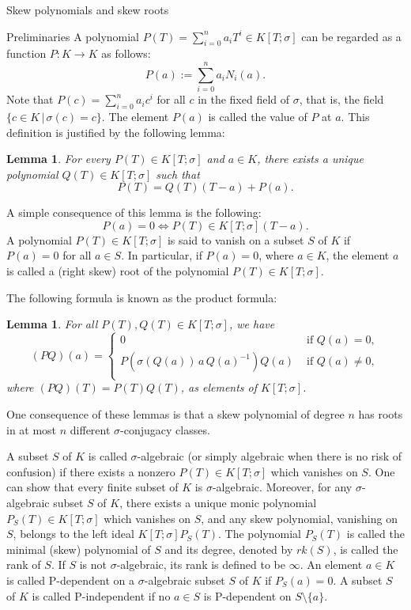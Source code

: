 \documentclass[11pt,a4paper]{article}
\theoremstyle{theorem}
\newtheorem{lemma}[theorem]{Lemma}
\numberwithin{equation}{section}
\newcommand{\s}{\sigma}
\begin{document}
\begin{section}{Skew polynomials and skew roots}
\begin{subsection}{Preliminaries}
	A polynomial $P(T)=\sum_{i=0}^{n}a_iT^i\in K[T;\s]$ can be regarded as a function $P:K\to K$ as follows:
	$$P(a):=\sum_{i=0}^{n}a_iN_i(a).$$
	Note that $P(c)=\sum_{i=0}^{n}a_ic^i$ for all $c$ in the fixed field of $\s$, that is, the field $\{c\in K\,|\, \s(c)=c\}$. The element $P(a)$ is called the value of $P$ at $a$. This definition is justified by the following lemma:
	\begin{lemma}\label{(L)DivisionP(a)}
	For every $P(T)\in K[T;\sigma]$ and $a\in K$, there exists a unique polynomial $Q(T)\in  K[T;\sigma]$  such that 
	$$P(T)=Q(T)(T-a)+P(a).$$			
	\end{lemma}
	A simple consequence of this lemma is the following: 
	$$P(a)=0\iff P(T)\in  K[T;\sigma](T-a).$$
	A polynomial $P(T)\in K[T;\sigma]$ is said to vanish on a subset $S$ of $K$ if $P(a)=0$ for all $a\in S$. In particular, if $P(a)=0$, where $a\in K$, the element $a$ is called a (right skew) root of the polynomial $P(T)\in K[T;\sigma]$. 
	
	The following formula is known as the product formula:	 
	\begin{lemma}\label{(L)ProductPQ(a)}
		For all $P(T), Q(T)\in K[T;\sigma]$, we have
		$$(PQ)(a)=\begin{cases}
			0& \text{ if } Q(a)=0,\\
			P\left( \sigma(Q(a))\, a \, Q(a)^{-1}\right) Q(a)  & \text{ if } Q(a)\neq 0,\\
		\end{cases}
		$$
		where  $(PQ)(T)=P(T)Q(T)$, as elements of $K[T;\sigma]$.  
	\end{lemma}

	One consequence of these lemmas is that a skew polynomial of degree $n$ has roots in at most $n$ different $\s$-conjugacy classes. 
	
	A subset $S$ of $K$ is called $\s$-algebraic (or simply algebraic when there is no risk of confusion) if there exists a nonzero $P(T)\in K[T;\s]$  which vanishes on $S$. One can show that every finite   subset  of $K$ is $\s$-algebraic. Moreover, 
	for any $\s$-algebraic subset $S$ of $K$, there exists a unique monic polynomial $P_S(T)\in K[T;\s]$ which vanishes on $S$, and any skew polynomial, vanishing on $S$, belongs to the left ideal $K[T;\s]P_S(T)$. The polynomial $P_S(T)$ is called the minimal (skew) polynomial of $S$ and its  degree, denoted by $rk(S)$, is called the rank of $S$. If $S$ is not $\s$-algebraic, its rank is defined to be $\infty$.  An element $a\in K$ is called P-dependent on a  $\s$-algebraic subset $S$ of $K$ if $P_S(a)=0$.  A subset $S$ of $K$ is called  P-independent  if no $a\in S$ is P-dependent on $S\setminus \{a\}$. 	
	

\end{subsection}
\end{section}
\end{document}
